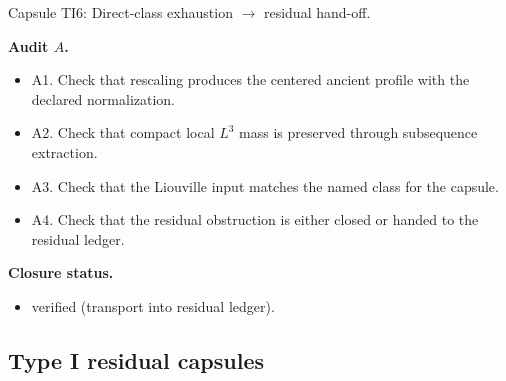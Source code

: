 \documentclass[11pt]{amsart}
\newcommand{\capsulefield}[1]{\par\smallskip\noindent\textbf{#1.}\ }
\begin{document}
\begin{proofcapsule}{Capsule TI6: Direct-class exhaustion $\to$ residual hand-off.}
  \capsulefield{Audit \(A\)}
  \begin{itemize}[leftmargin=1.8em]
  \item A1. Check that rescaling produces the centered ancient profile with the declared normalization.
  \item A2. Check that compact local $L^3$ mass is preserved through subsequence extraction.
  \item A3. Check that the Liouville input matches the named class for the capsule.
  \item A4. Check that the residual obstruction is either closed or handed to the residual ledger.
  \end{itemize}
  \capsulefield{Closure status}
  \begin{itemize}[leftmargin=1.8em]
  \item verified (transport into residual ledger).
  \end{itemize}
\end{proofcapsule}

\subsection{Type I residual capsules}
\end{document}
